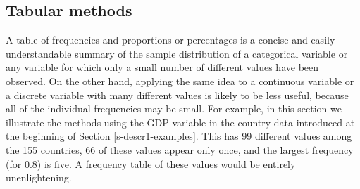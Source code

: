 \documentclass[11pt,a4paper,openany]{book}
\begin{document}
\subsection{Tabular methods}\label{ss-descr1-1cont-tab}

A table of frequencies and proportions or percentages is a concise and
easily understandable summary of the sample distribution of a
categorical variable or any variable for which only a small number of
different values have been observed. On the other hand, applying the
same idea to a continuous variable or a discrete variable with many
different values is likely to be less useful, because all of the
individual frequencies may be small. For example, in this section we
illustrate the methods using the GDP variable in the country data
introduced at the beginning of Section \ref{s-descr1-examples}. This has
99 different values among the 155 countries, 66 of these values appear
only once, and the largest frequency (for 0.8) is five. A frequency
table of these values would be entirely unenlightening.
\end{document}
